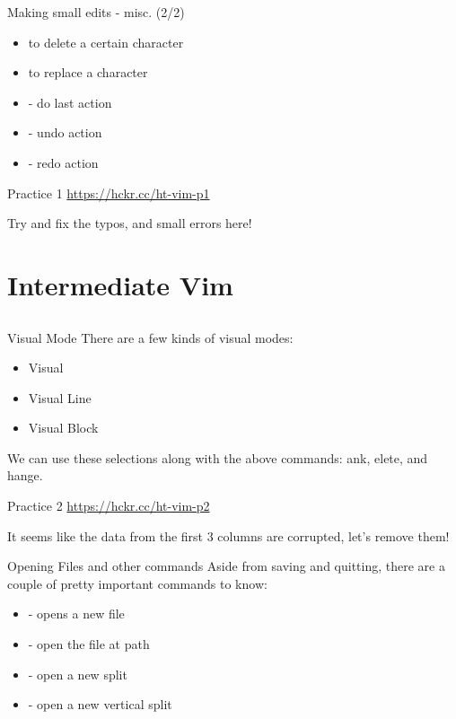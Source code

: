 \documentclass[12pt]{beamer}
\begin{document}
\begin{frame}{Making small edits - misc. (2/2)}
    \begin{itemize}
        \item {} to delete a certain character
        \item {} to replace a character
        \item {} - do last action
        \item {} - undo action
        \item {} - redo action
    \end{itemize}{}
\end{frame}{}

\begin{frame}{Practice 1}
    \url{https://hckr.cc/ht-vim-p1}

    Try and fix the typos, and small errors here!
\end{frame}{}

\section{Intermediate Vim}
\subsection{}
\begin{frame}{Visual Mode}
    There are a few kinds of visual modes:
    \begin{itemize}
        \item Visual 
        \item Visual Line 
        \item Visual Block 
    \end{itemize}{}{}
    We can use these selections along with the above commands: ank, elete, and hange.
\end{frame}{}

\begin{frame}{Practice 2}
    \url{https://hckr.cc/ht-vim-p2}

    It seems like the data from the first 3 columns are corrupted, let's remove them!
\end{frame}{}

\begin{frame}{Opening Files and other commands}
    Aside from saving and quitting, there are a couple of pretty important commands to know:
    \begin{itemize}
        \item {} - opens a new file
        \item {} - open the file at path
        \item {} - open a new split
        \item {} - open a new vertical split
    \end{itemize}{}
\end{frame}{}
\end{document}
